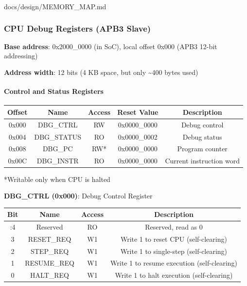 \begin{relocated}{docs/design/MEMORY_MAP.md}
\subsubsection{CPU Debug Registers (APB3 Slave)}\label{ds:mm:memory-map:cpu-debug-registers-apb3-slave}

\textbf{Base address}: 0x2000\_\allowbreak{}0000 (in SoC), local offset
0x000 (APB3 12-bit addressing)

\textbf{Address width}: 12 bits (4 KB space, but only \textasciitilde400
bytes used)

\paragraph{Control and Status Registers}\label{ds:mm:memory-map:control-and-status-registers}

{
\begin{longtable}[]{@{}ccccc@{}}
\toprule\noalign{}
Offset & Name & Access & Reset Value & Description \\
\midrule\noalign{}
\endhead
\bottomrule\noalign{}
\endlastfoot
0x000 & DBG\_CTRL & RW & 0x0000\_\allowbreak{}0000 & Debug control \\
0x004 & DBG\_\allowbreak{}STATUS & RO & 0x0000\_\allowbreak{}0002 &
Debug status \\
0x008 & DBG\_PC & RW* & 0x0000\_\allowbreak{}0000 & Program counter \\
0x00C & DBG\_INSTR & RO & 0x0000\_\allowbreak{}0000 & Current
instruction word \\
\end{longtable}
}

*Writable only when CPU is halted

\textbf{DBG\_CTRL (0x000)}: Debug Control Register

{
\begin{longtable}[]{@{}cccc@{}}
\toprule\noalign{}
Bit & Name & Access & Description \\
\midrule\noalign{}
\endhead
\bottomrule\noalign{}
\endlastfoot
31:4 & Reserved & RO & Reserved, read as 0 \\
3 & RESET\_REQ & W1 & Write 1 to reset CPU (self-clearing) \\
2 & STEP\_REQ & W1 & Write 1 to single-step (self-clearing) \\
1 & RESUME\_\allowbreak{}REQ & W1 & Write 1 to resume execution
(self-clearing) \\
0 & HALT\_REQ & W1 & Write 1 to halt execution (self-clearing) \\
\end{longtable}
}


\end{relocated}
